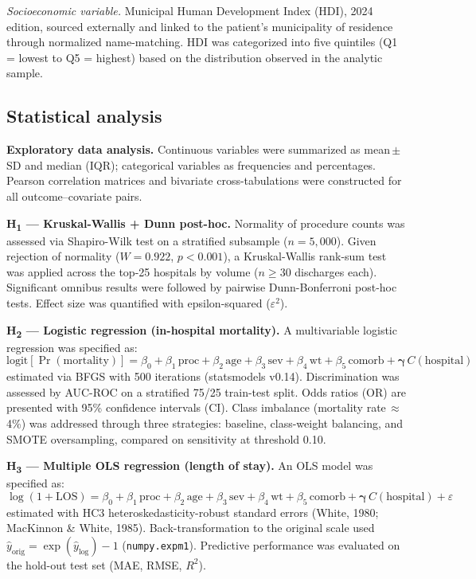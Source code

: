 \documentclass[10pt,twocolumn]{article}
\begin{document}
\textit{Socioeconomic variable.} Municipal Human Development Index (HDI), 2024 edition,
sourced externally and linked to the patient's municipality of residence through
normalized name-matching. HDI was categorized into five quintiles (Q1 = lowest to
Q5 = highest) based on the distribution observed in the analytic sample.

\subsection{Statistical analysis}

\textbf{Exploratory data analysis.} Continuous variables were summarized as mean\,$\pm$\,SD
and median (IQR); categorical variables as frequencies and percentages. Pearson
correlation matrices and bivariate cross-tabulations were constructed for all
outcome–covariate pairs.

\textbf{H\textsubscript{1} — Kruskal-Wallis + Dunn post-hoc.}
Normality of procedure counts was assessed via Shapiro-Wilk test on a stratified
subsample ($n = 5{,}000$). Given rejection of normality ($W = 0{.}922$,
$p < 0{.}001$), a Kruskal-Wallis rank-sum test was applied across the top-25
hospitals by volume ($n \geq 30$ discharges each). Significant omnibus results were
followed by pairwise Dunn-Bonferroni post-hoc tests. Effect size was quantified
with epsilon-squared ($\varepsilon^2$).

\textbf{H\textsubscript{2} — Logistic regression (in-hospital mortality).}
A multivariable logistic regression was specified as:
\begin{equation*}
  \text{logit}[\Pr(\text{mortality})] = \beta_0 + \beta_1\,\text{proc} +
  \beta_2\,\text{age} + \beta_3\,\text{sev} + \beta_4\,\text{wt} +
  \beta_5\,\text{comorb} + \boldsymbol{\gamma}\,C(\text{hospital})
\end{equation*}
estimated via BFGS with 500 iterations (statsmodels v0.14). Discrimination was
assessed by AUC-ROC on a stratified 75/25 train-test split. Odds ratios (OR) are
presented with 95\% confidence intervals (CI). Class imbalance (mortality rate\,$\approx$\,4\%)
was addressed through three strategies: baseline, class-weight balancing, and
SMOTE oversampling, compared on sensitivity at threshold 0.10.

\textbf{H\textsubscript{3} — Multiple OLS regression (length of stay).}
An OLS model was specified as:
\begin{equation*}
  \log(1 + \text{LOS}) = \beta_0 + \beta_1\,\text{proc} + \beta_2\,\text{age} +
  \beta_3\,\text{sev} + \beta_4\,\text{wt} + \beta_5\,\text{comorb} +
  \boldsymbol{\gamma}\,C(\text{hospital}) + \varepsilon
\end{equation*}
estimated with HC3 heteroskedasticity-robust standard errors (White, 1980;
MacKinnon \& White, 1985). Back-transformation to the original scale used
$\hat{y}_{\text{orig}} = \exp(\hat{y}_{\log}) - 1$ (\texttt{numpy.expm1}).
Predictive performance was evaluated on the hold-out test set (MAE, RMSE, $R^2$).
\end{document}
